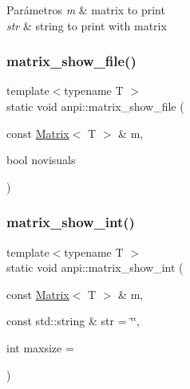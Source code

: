 \begin{DoxyParams}{Parámetros}
{\em m} & matrix to print \\
\hline
{\em str} & string to print with matrix \\
\hline
\end{DoxyParams}
\mbox{\label{namespaceanpi_a18764748dc82a28d7d9d890332fb703a}} 
\subsubsection{\texorpdfstring{matrix\+\_\+show\+\_\+file()}{matrix\_show\_file()}}
{\footnotesize\ttfamily template$<$typename T $>$ \\
static void anpi\+::matrix\+\_\+show\+\_\+file (\begin{DoxyParamCaption}\item[{const \hyperlink{classanpi_1_1Matrix}{Matrix}$<$ T $>$ \&}]{m,  }\item[{bool}]{novisuals }\end{DoxyParamCaption})\hspace{0.3cm}{\ttfamily [static]}}

\mbox{\label{namespaceanpi_a0864d768e170ecba07b469f4795ecf59}} 
\subsubsection{\texorpdfstring{matrix\+\_\+show\+\_\+int()}{matrix\_show\_int()}}
{\footnotesize\ttfamily template$<$typename T $>$ \\
static void anpi\+::matrix\+\_\+show\+\_\+int (\begin{DoxyParamCaption}\item[{const \hyperlink{classanpi_1_1Matrix}{Matrix}$<$ T $>$ \&}]{m,  }\item[{const std\+::string \&}]{str = {\ttfamily \char`\"{}\char`\"{}},  }\item[{int}]{maxsize = {} }\end{DoxyParamCaption})\hspace{0.3cm}{\ttfamily [static]}}

\mbox{\label{namespaceanpi_a2b732f1fc647ede34024f3441c37ae45}} 
